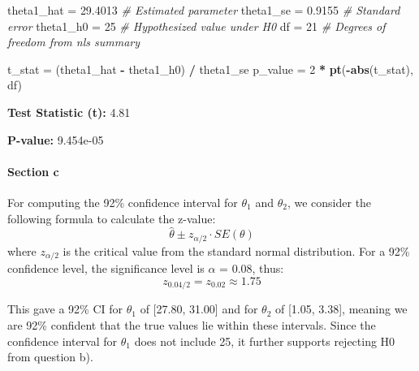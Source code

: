 \documentclass[
  11pt,
]{article}
\newenvironment{Shaded}{\begin{snugshade}}{\end{snugshade}}
\newcommand{\CommentTok}[1]{\textcolor[rgb]{0.56,0.35,0.01}{\textit{#1}}}
\newcommand{\DecValTok}[1]{\textcolor[rgb]{0.00,0.00,0.81}{#1}}
\newcommand{\FloatTok}[1]{\textcolor[rgb]{0.00,0.00,0.81}{#1}}
\newcommand{\FunctionTok}[1]{\textcolor[rgb]{0.13,0.29,0.53}{\textbf{#1}}}
\newcommand{\NormalTok}[1]{#1}
\newcommand{\OtherTok}[1]{\textcolor[rgb]{0.56,0.35,0.01}{#1}}
\newcommand{\SpecialCharTok}[1]{\textcolor[rgb]{0.81,0.36,0.00}{\textbf{#1}}}
\begin{document}
\begin{Shaded}
\begin{Highlighting}[]
\NormalTok{theta1\_hat }\OtherTok{=} \FloatTok{29.4013}  \CommentTok{\# Estimated parameter}
\NormalTok{theta1\_se }\OtherTok{=} \FloatTok{0.9155}    \CommentTok{\# Standard error}
\NormalTok{theta1\_h0 }\OtherTok{=} \DecValTok{25}        \CommentTok{\# Hypothesized value under H0}
\NormalTok{df }\OtherTok{=} \DecValTok{21}               \CommentTok{\# Degrees of freedom from nls summary}

\NormalTok{t\_stat }\OtherTok{=}\NormalTok{ (theta1\_hat }\SpecialCharTok{{-}}\NormalTok{ theta1\_h0) }\SpecialCharTok{/}\NormalTok{ theta1\_se}
\NormalTok{p\_value }\OtherTok{=} \DecValTok{2} \SpecialCharTok{*} \FunctionTok{pt}\NormalTok{(}\SpecialCharTok{{-}}\FunctionTok{abs}\NormalTok{(t\_stat), df)}
\end{Highlighting}
\end{Shaded}

\textbf{Test Statistic (t):} 4.81

\textbf{P-value:} 9.454e-05

\paragraph{Section c}\label{section-c-2}

For computing the 92\% confidence interval for \(\theta_1\) and
\(\theta_2\), we consider the following formula to calculate the
z-value: \[
\hat{\theta} \pm z_{\alpha/2} \cdot SE(\theta)
\] where \(z_{\alpha/2}\) is the critical value from the standard normal
distribution. For a 92\% confidence level, the significance level is
\(\alpha\) = 0.08, thus: \[z_{0.04/2} = z_{0.02} \approx 1.75\]

This gave a 92\% CI for \(\theta_1\)\hspace{0pt} of {[}27.80, 31.00{]}
and for \(\theta_2\)\hspace{0pt} of {[}1.05, 3.38{]}, meaning we are
92\% confident that the true values lie within these intervals. Since
the confidence interval for \(\theta_1\)\hspace{0pt} does not include
25, it further supports rejecting H0\hspace{0pt} from question b).
\end{document}
